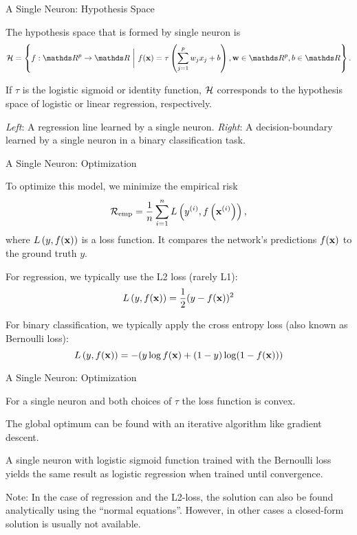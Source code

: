 \documentclass[11pt,compress,t,notes=noshow, xcolor=table]{beamer}
\begin{document}
\begin{framei}{A Single Neuron: Hypothesis Space}
\item The hypothesis space that is formed by single neuron %
is 
{\small
$$\Hspace  = \left\{f: \R^p \to \R ~\bigg|~ \fx = \tau\left(\sum_{j = 1}^p w_j x_j + b\right), \wtw \in \R^p, b \in \R\right\}.$$}
\item If $\tau$ is the logistic sigmoid or identity function, $\mathcal{H}$ corresponds to the hypothesis space of logistic or linear regression, respectively.

\vfill
{}
\centerline{\tiny \textit{Left}: A regression line learned by a single neuron. \textit{Right}: A decision-boundary learned by a single neuron in a binary classification task.}
\end{framei}

\begin{framei} {A Single Neuron: Optimization}
\item To optimize this model, we minimize the empirical risk 
$$\mathcal{R}_{\text{emp}} = \frac{1}{n} \sum\limits_{i=1}^n L\left(y^{(i)}, f\left(\mathbf{x}^{(i)}\right)\right),$$
where $L\left(y, f(\mathbf{x})\right)$ is a loss function. It compares the network's predictions $f(\mathbf{x})$ to the ground truth $y$. 
\item For regression, we typically use the L2 loss (rarely L1): $$L\left(y, f(\mathbf{x})\right) = \frac{1}{2}(y - f(\mathbf{x}))^2$$
\item For binary classification, we typically apply the cross entropy loss (also known as Bernoulli loss): $$L\left(y, f(\mathbf{x})\right) = -(y \log f(\mathbf{x}) + (1 - y) \log(1 - f(\mathbf{x})))$$
\end{framei}

\begin{framei} {A Single Neuron: Optimization}
\item For a single neuron and both choices of $\tau$ the loss function is convex.
\item The global optimum can be found with an iterative algorithm like gradient descent. 
\item A single neuron with logistic sigmoid function trained with the Bernoulli loss %
 yields the %
 same result as logistic regression when trained until convergence.
\item Note: In the case of regression and the L2-loss, the solution can
also be found analytically using the “normal equations”. However, in other cases a closed-form solution is usually not available.
\end{framei} 

\endlecture
\end{document}
